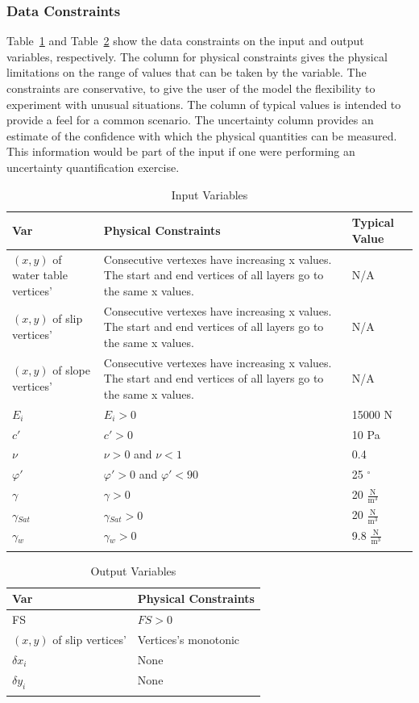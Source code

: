 \documentclass[12pt]{article}
\begin{document}
\subsubsection{Data Constraints}
\label{Sec:DataCons}
Table~\ref{Table:InpuVari} and Table~\ref{Table:OutpVari} show the data constraints on the input and output variables, respectively. The column for physical constraints gives the physical limitations on the range of values that can be taken by the variable. The constraints are conservative, to give the user of the model the flexibility to experiment with unusual situations. The column of typical values is intended to provide a feel for a common scenario. The uncertainty column provides an estimate of the confidence with which the physical quantities can be measured. This information would be part of the input if one were performing an uncertainty quantification exercise.
\begin{longtable}{l l l}
\toprule
Var & Physical Constraints & Typical Value
\\
\midrule
$(x,y)$ of water table vertices' & Consecutive vertexes have increasing x values. The start and end vertices of all layers go to the same x values. & N/A
\\
$(x,y)$ of slip vertices' & Consecutive vertexes have increasing x values. The start and end vertices of all layers go to the same x values. & N/A
\\
$(x,y)$ of slope vertices' & Consecutive vertexes have increasing x values. The start and end vertices of all layers go to the same x values. & N/A
\\
$E_{i}$ & $E_{i}>0$ & 15000 N
\\
$c'$ & $c'>0$ & 10 Pa
\\
$\nu{}$ & $\nu{}>0$ and $\nu{}<1$ & 0.4
\\
$\varphi{}'$ & $\varphi{}'>0$ and $\varphi{}'<90$ & 25 ${}^{\circ}$
\\
$\gamma{}$ & $\gamma{}>0$ & 20 $\frac{\text{N}}{\text{m}^{3}}$
\\
$\gamma{}_{Sat}$ & $\gamma{}_{Sat}>0$ & 20 $\frac{\text{N}}{\text{m}^{3}}$
\\
$\gamma{}_{w}$ & $\gamma{}_{w}>0$ & 9.8 $\frac{\text{N}}{\text{m}^{3}}$
\\
\bottomrule
\caption{Input Variables}
\label{Table:InpuVari}
\end{longtable}
\begin{longtable}{l l}
\toprule
Var & Physical Constraints
\\
\midrule
FS & $FS>0$
\\
$(x,y)$ of slip vertices' & Vertices's monotonic
\\
$\delta{}x_{i}$ & None
\\
$\delta{}y_{i}$ & None
\\
\bottomrule
\caption{Output Variables}
\label{Table:OutpVari}
\end{longtable}
\end{document}

